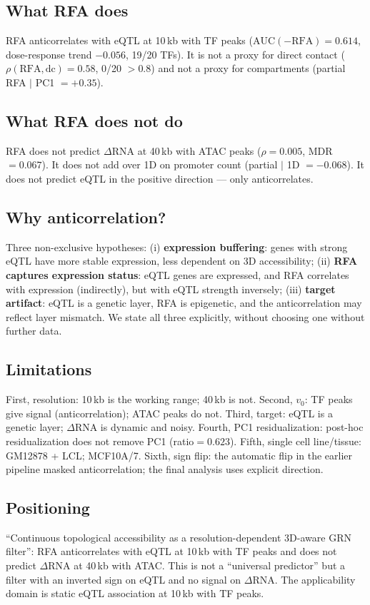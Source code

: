 \documentclass[11pt,a4paper]{article}
\begin{document}
\subsection{What RFA does}
RFA anticorrelates with eQTL at 10\,kb with TF peaks ($\mathrm{AUC}(-\mathrm{RFA})=0.614$, dose-response trend $-0.056$, 19/20 TFs). It is not a proxy for direct contact ($\rho(\mathrm{RFA},\mathrm{dc})=0.58$, 0/20 $>0.8$) and not a proxy for compartments (partial RFA $\mid$ PC1 $=+0.35$).

\subsection{What RFA does not do}
RFA does not predict $\Delta$RNA at 40\,kb with ATAC peaks ($\rho=0.005$, MDR$=0.067$). It does not add over 1D on promoter count (partial $\mid$ 1D $= -0.068$). It does not predict eQTL in the positive direction --- only anticorrelates.

\subsection{Why anticorrelation?}
Three non-exclusive hypotheses: (i) \textbf{expression buffering}: genes with strong eQTL have more stable expression, less dependent on 3D accessibility; (ii) \textbf{RFA captures expression status}: eQTL genes are expressed, and RFA correlates with expression (indirectly), but with eQTL strength inversely; (iii) \textbf{target artifact}: eQTL is a genetic layer, RFA is epigenetic, and the anticorrelation may reflect layer mismatch. We state all three explicitly, without choosing one without further data.

\subsection{Limitations}
First, resolution: 10\,kb is the working range; 40\,kb is not. Second, $v_0$: TF peaks give signal (anticorrelation); ATAC peaks do not. Third, target: eQTL is a genetic layer; $\Delta$RNA is dynamic and noisy. Fourth, PC1 residualization: post-hoc residualization does not remove PC1 (ratio$=0.623$). Fifth, single cell line/tissue: GM12878 + LCL; MCF10A/7. Sixth, sign flip: the automatic flip in the earlier pipeline masked anticorrelation; the final analysis uses explicit direction.

\subsection{Positioning}
``Continuous topological accessibility as a resolution-dependent 3D-aware GRN filter'': RFA anticorrelates with eQTL at 10\,kb with TF peaks and does not predict $\Delta$RNA at 40\,kb with ATAC. This is not a ``universal predictor'' but a filter with an inverted sign on eQTL and no signal on $\Delta$RNA. The applicability domain is static eQTL association at 10\,kb with TF peaks.
\end{document}
